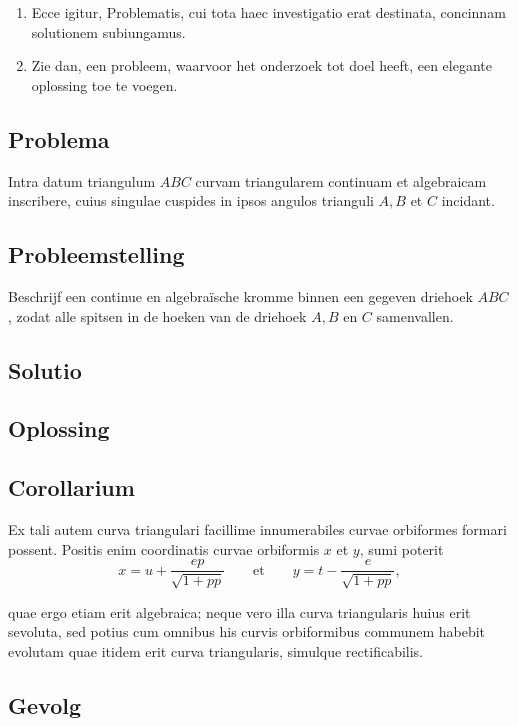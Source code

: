 \documentclass[10pt,a4paper]{article}
\newcommand{\switchenum}{\setcounter{enumi}{\arabic{enumi}-1}\switchcolumn}
\begin{document}
\begin{paracol}{2}
\begin{enumerate}[topsep=1px]
		\switchcolumn*
		
		\item Ecce igitur, Problematis, cui tota haec investigatio erat destinata, concinnam solutionem subiungamus.
		
		\switchenum
		\item Zie dan, een probleem, waarvoor het onderzoek tot doel heeft, een elegante oplossing toe te voegen.
		\switchcolumn*
	\end{enumerate}		


	\subsection*{Problema}
	\par Intra datum triangulum $A B C$ curvam triangularem continuam et algebraicam inscribere, cuius singulae cuspides in ipsos angulos trianguli $A, B$ et $C$ incidant.
	
	\switchcolumn
	\subsection*{Probleemstelling}
	\par Beschrijf een continue en algebraïsche kromme binnen een gegeven driehoek $ABC$, zodat alle spitsen in de hoeken van de driehoek $A,B$ en $C$ samenvallen.
	\switchcolumn*
	
	\subsection*{Solutio}
	
	\switchcolumn
	\subsection*{Oplossing}
	\switchcolumn*
	
	\subsection*{Corollarium}
	\par Ex tali autem curva triangulari facillime innumerabiles curvae orbiformes formari possent. Positis enim coordinatis curvae orbiformis $x$ et $y$, sumi poterit
	\[
		x=u+\dfrac{ep}{\sqrt{1+pp}} \qquad \text{et} \qquad y=t-\dfrac{e}{\sqrt{1+pp}},
	\]
	\par quae ergo etiam erit algebraica; neque vero illa curva triangularis huius erit sevoluta, sed potius cum omnibus his curvis orbiformibus communem  habebit evolutam quae itidem erit curva triangularis, simulque rectificabilis.

	\switchcolumn
	\subsection*{Gevolg}
	\switchcolumn*

	\end{paracol}
\newpage
\end{document}
